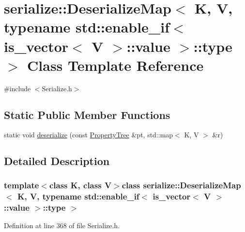 \hypertarget{classserialize_1_1_deserialize_map_3_01_k_00_01_v_00_01typename_01std_1_1enable__if_3_01is__vected2d1ee1f8886a5a92a6dbc69e18bdcd}{}\section{serialize\+:\+:Deserialize\+Map$<$ K, V, typename std\+:\+:enable\+\_\+if$<$ is\+\_\+vector$<$ V $>$\+:\+:value $>$\+:\+:type $>$ Class Template Reference}
\label{classserialize_1_1_deserialize_map_3_01_k_00_01_v_00_01typename_01std_1_1enable__if_3_01is__vected2d1ee1f8886a5a92a6dbc69e18bdcd}


{\ttfamily \#include $<$Serialize.\+h$>$}

\subsection*{Static Public Member Functions}
\begin{DoxyCompactItemize}
\item 
static void \hyperlink{classserialize_1_1_deserialize_map_3_01_k_00_01_v_00_01typename_01std_1_1enable__if_3_01is__vected2d1ee1f8886a5a92a6dbc69e18bdcd_a4ac8a4888f9383e338904ed4ea0ab4a7}{deserialize} (const \hyperlink{namespacesolar__core_adeda2737d6938c190eb774a5b2495045}{Property\+Tree} \&pt, std\+::map$<$ K, V $>$ \&r)
\end{DoxyCompactItemize}


\subsection{Detailed Description}
\subsubsection*{template$<$class K, class V$>$class serialize\+::\+Deserialize\+Map$<$ K, V, typename std\+::enable\+\_\+if$<$ is\+\_\+vector$<$ V $>$\+::value $>$\+::type $>$}



Definition at line 368 of file Serialize.\+h.



